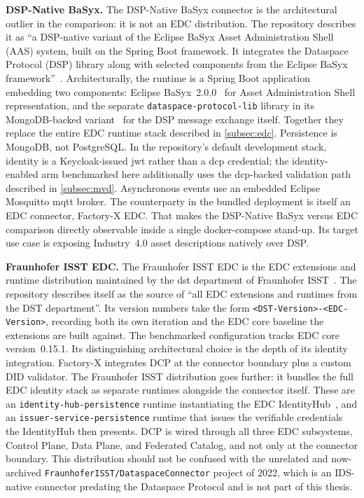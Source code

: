 \textbf{DSP-Native BaSyx.} The DSP-Native BaSyx connector is the architectural outlier in the comparison: it is not an EDC distribution. The repository describes it as ``a DSP-native variant of the Eclipse BaSyx Asset Administration Shell (AAS) system, built on the Spring Boot framework. It integrates the Dataspace Protocol (DSP) library along with selected components from the Eclipse BaSyx framework''~\citep{dspNativeBasyx}. Architecturally, the runtime is a Spring Boot application embedding two components: Eclipse BaSyx~2.0.0~\citep{eclipseBasyxDocs} for Asset Administration Shell representation, and the separate \texttt{dataspace-protocol-lib} library in its MongoDB-backed variant~\citep{dspProtocolLib} for the DSP message exchange itself. Together they replace the entire EDC runtime stack described in \cref{subsec:edc}. Persistence is MongoDB, not PostgreSQL. In the repository's default development stack, identity is a Keycloak-issued \gls{jwt} rather than a \gls{dcp} credential; the identity-enabled arm benchmarked here additionally uses the \gls{dcp}-backed validation path described in \cref{subsec:mvd}. Asynchronous events use an embedded Eclipse Mosquitto \gls{mqtt} broker. The counterparty in the bundled deployment is itself an EDC connector, Factory-X EDC. That makes the DSP-Native BaSyx versus EDC comparison directly observable inside a single docker-compose stand-up. Its target use case is exposing Industry~4.0 asset descriptions natively over DSP.

\textbf{Fraunhofer ISST EDC.} The Fraunhofer ISST EDC is the EDC extensions and runtime distribution maintained by the \gls{dst} department of Fraunhofer ISST~\citep{fraunhoferIsstDst}. The repository describes itself as the source of ``all EDC extensions and runtimes from the DST department''. Its version numbers take the form \texttt{<DST-Version>-<EDC-Version>}, recording both its own iteration and the EDC core baseline the extensions are built against. The benchmarked configuration tracks EDC core version~0.15.1. Its distinguishing architectural choice is the depth of its identity integration. Factory-X integrates DCP at the connector boundary plus a custom DID validator. The Fraunhofer ISST distribution goes further: it bundles the full EDC identity stack as separate runtimes alongside the connector itself. These are an \texttt{identity-hub-persistence} runtime instantiating the EDC IdentityHub~\citep{eclipseEdcIdentityHub}, and an \texttt{issuer-service-persistence} runtime that issues the verifiable credentials the IdentityHub then presents. DCP is wired through all three EDC subsystems, Control Plane, Data Plane, and Federated Catalog, and not only at the connector boundary. This distribution should not be confused with the unrelated and now-archived \texttt{FraunhoferISST/DataspaceConnector} project of 2022, which is an IDS-native connector predating the Dataspace Protocol and is not part of this thesis.

